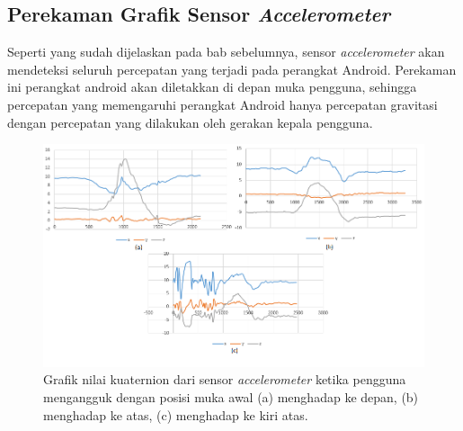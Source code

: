 \subsection{Perekaman Grafik Sensor \textit{Accelerometer}}
\label{sec:analisis_grafik_sensor_accelerometer}
Seperti yang sudah dijelaskan pada bab sebelumnya, sensor \textit{accelerometer} akan mendeteksi seluruh percepatan yang terjadi pada perangkat Android. Perekaman ini perangkat android akan diletakkan di depan muka pengguna, sehingga percepatan yang memengaruhi perangkat Android hanya percepatan gravitasi dengan percepatan yang dilakukan oleh gerakan kepala pengguna. 

\begin{figure}[htbp]
\centering
\includegraphics[scale=0.6]{Gambar/grafik-sensor-accelerometer-mengangguk.png}
\caption{Grafik nilai kuaternion dari sensor \textit{accelerometer} ketika pengguna mengangguk dengan posisi muka awal (a) menghadap ke depan, (b) menghadap ke atas, (c) menghadap ke kiri atas.} 
\label{fig:grafik-sensor-accelerometer-mengangguk}
\end{figure}

